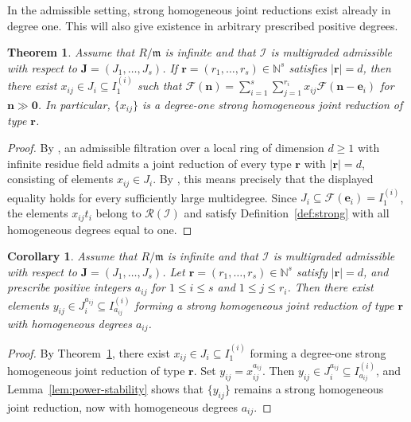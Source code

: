 \documentclass[reqno,12pt]{amsart}
\theoremstyle{plain}
\newtheorem{thm}[prop]{Theorem}
\newtheorem{cor}[prop]{Corollary}
\theoremstyle{definition}
\theoremstyle{remark}
\newcommand{\N}{\mathbb N}
\numberwithin{equation}{section}
\begin{document}
In the admissible setting, strong homogeneous joint reductions exist
already in degree one. This will also
give existence in arbitrary prescribed positive degrees.

\begin{thm}
\label{thm:strong-existence}
Assume that $R/\mathfrak m$ is infinite and that
$\boldsymbol{\mathcal I}$ is multigraded admissible with respect to
$\mathbf J=(J_1,\ldots,J_s)$. If
$\mathbf r=(r_1,\ldots,r_s)\in\N^s$ satisfies $|\mathbf r|=d$, then
there exist $x_{ij}\in J_i\subseteq I_1^{(i)}$ such that $\mathcal F(\mathbf n)
=
\sum_{i=1}^{s}\sum_{j=1}^{r_i}
 x_{ij}\mathcal F(\mathbf n-\mathbf e_i)$ for  $\mathbf n\gg\mathbf0$. In particular, $\{x_{ij}\}$ is a degree-one strong homogeneous joint
reduction of type $\mathbf r$.
\end{thm}

\begin{proof}
By \cite[Theorem~2.4]{SarkarVerma}, an admissible filtration over a local
ring of dimension $d\geq1$ with infinite residue field admits a joint
reduction of every type $\mathbf r$ with $|\mathbf r|=d$, consisting of
elements $x_{ij}\in J_i$. By
\cite[Definition~1.6]{SarkarVerma}, this means precisely that the
displayed equality holds for every sufficiently large multidegree.
Since $J_i\subseteq\mathcal F(\mathbf e_i)=I_1^{(i)}$, the elements
$x_{ij}t_i$ belong to $\mathcal R(\boldsymbol{\mathcal I})$ and satisfy
Definition~\ref{def:strong} with all homogeneous degrees equal to one.
\end{proof}

\begin{cor}
\label{cor:weighted-strong-existence}
Assume that $R/\mathfrak m$ is infinite and that
$\boldsymbol{\mathcal I}$ is multigraded admissible with respect to
$\mathbf J=(J_1,\ldots,J_s)$. Let
$\mathbf r=(r_1,\ldots,r_s)\in\mathbb N^s$ satisfy $|\mathbf r|=d$,
and prescribe positive integers $a_{ij}$ for
$1\leq i\leq s$ and $1\leq j\leq r_i$. Then there exist elements $y_{ij}\in J_i^{a_{ij}}\subseteq I_{a_{ij}}^{(i)}$
forming a strong homogeneous joint reduction of type $\mathbf r$ with
homogeneous degrees $a_{ij}$.
\end{cor}

\begin{proof}
By Theorem~\ref{thm:strong-existence}, there exist
$x_{ij}\in J_i\subseteq I_1^{(i)}$ forming a degree-one strong
homogeneous joint reduction of type $\mathbf r$. Set
$y_{ij}=x_{ij}^{a_{ij}}$. Then
$y_{ij}\in J_i^{a_{ij}}\subseteq I_{a_{ij}}^{(i)}$, and
Lemma~\ref{lem:power-stability} shows that $\{y_{ij}\}$ remains a strong
homogeneous joint reduction, now with homogeneous degrees $a_{ij}$.
\end{proof}
\end{document}
